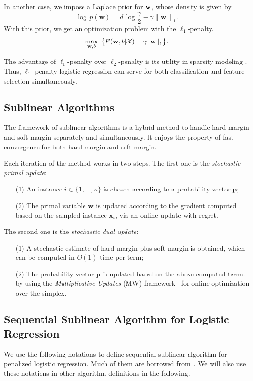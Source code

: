 \documentclass{llncs}
\newcommand{\bw}{\mathbf{w}}
\newcommand{\bp}{\mathbf{p}}
\newcommand{\lc}{\left(}
\newcommand{\rc}{\right)}
\def\w{{\bf w}}
\def\XM{{\mathcal X}}
\begin{document}
In another case, we impose a Laplace prior for $\w$, whose density is given by
\[	
\log\,p\lc\bw \rc=d\,\log\frac{\gamma}{2}-\gamma{\|\bw\|}_{1}.
\]
With this prior, we get an optimization problem with the $\ell_1$-penalty.
\begin{equation} \label{eqn:5}
	\max_{\bw ,b} \;  \big\{F(\w, b|\XM)- \gamma{\|\bw \|}_{1}\big\}.	
\end{equation}

The advantage of $\ell_1$-penalty over $\ell_2$-penalty is its utility in sparsity modeling \cite{tibshirani1996regression}.
Thus, $\ell_1$-penalty logistic regression can serve for both classification and feature selection simultaneously.

\subsection{Sublinear Algorithms}
The framework of sublinear algorithms is a hybrid method to handle hard margin and soft margin separately and simultaneously.
It enjoys the property of fast convergence for both hard margin and soft margin.

Each iteration of the method works in two steps.
The first one is the \textit{stochastic primal update}:
\begin{enumerate}
\item[{(1)}] \; An instance $i\in \{1,\ldots, n\}$ is chosen according to a probability vector $\bp$;
\item[{(2)}] \; The primal variable $\bw$ is updated according to the gradient computed based on the sampled instance $\textbf{x}_i$, via an online update with regret.
\end{enumerate}

The second one is the \textit{stochastic dual update}:
\begin{enumerate}
\item[{(1)}] \; A stochastic estimate of hard margin plus soft margin is obtained, which can be computed in $O(1)$ time per term;
\item[{(2)}] \; The probability vector $\bp$ is updated based on the above computed terms by using the \textit{Multiplicative Updates} (MW) framework~\cite{arora2005multiplicative} for online optimization over the simplex.
\end{enumerate}

\subsection{Sequential Sublinear Algorithm for Logistic Regression} \label{sec:l2alg}
We use the following notations to define sequential sublinear algorithm for penalized logistic regression.
Much of them are borrowed from~\cite{peng2012sublinear}.
We will also use these notations in other algorithm definitions in the following.
\end{document}
